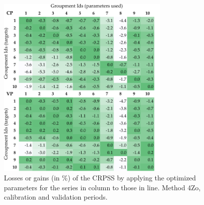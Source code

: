 \documentclass[review]{elsarticle}
\begin{document}
\begin{figure}[t]
	\centerline{\includegraphics[width=8.4cm]{figures/fig04.pdf}}
	\caption{Losses or gains (in \%) of the CRPSS by applying the optimized parameters for the series in column to those in line. Method 4Zo, calibration and validation periods.}
	\label{fig:crossing_4Zo}
\end{figure}
\end{document}
